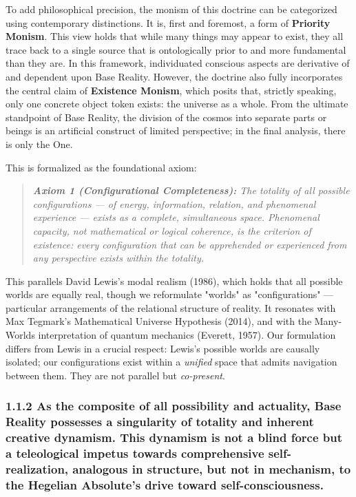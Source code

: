 To add philosophical precision, the monism of this doctrine can be categorized using contemporary distinctions. It is, first and foremost, a form of \textbf{Priority Monism}. This view holds that while many things may appear to exist, they all trace back to a single source that is ontologically prior to and more fundamental than they are. In this framework, individuated conscious aspects are derivative of and dependent upon Base Reality. However, the doctrine also fully incorporates the central claim of \textbf{Existence Monism}, which posits that, strictly speaking, only one concrete object token exists: the universe as a whole. From the ultimate standpoint of Base Reality, the division of the cosmos into separate parts or beings is an artificial construct of limited perspective; in the final analysis, there is only the One.


This is formalized as the foundational axiom:


\begin{quote}
\itshape
\textbf{Axiom 1 (Configurational Completeness):} \textit{The totality of all possible configurations — of energy, information, relation, and phenomenal experience — exists as a complete, simultaneous space. Phenomenal capacity, not mathematical or logical coherence, is the criterion of existence: every configuration that can be apprehended or experienced from any perspective exists within the totality.}
\end{quote}


This parallels David Lewis's modal realism (1986), which holds that all possible worlds are equally real, though we reformulate "worlds" as "configurations" — particular arrangements of the relational structure of reality. It resonates with Max Tegmark's Mathematical Universe Hypothesis (2014), and with the Many-Worlds interpretation of quantum mechanics (Everett, 1957). Our formulation differs from Lewis in a crucial respect: Lewis's possible worlds are causally isolated; our configurations exist within a \textit{unified} space that admits navigation between them. They are not parallel but \textit{co-present}.


\subsubsection*{1.1.2 As the composite of all possibility and actuality, Base Reality possesses a singularity of totality and inherent creative dynamism. This dynamism is not a blind force but a teleological impetus towards comprehensive self-realization, analogous in structure, but not in mechanism, to the Hegelian Absolute's drive toward self-consciousness.}


